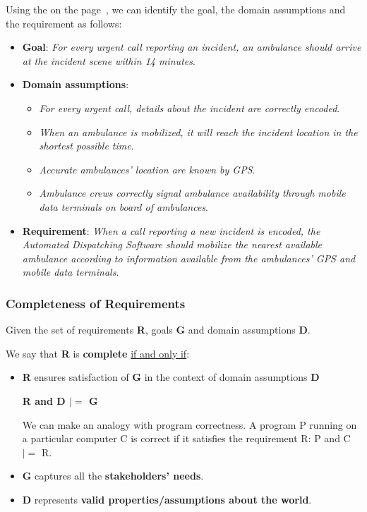 \noindent
Using the  on the page~\pageref{example: ambulance dispatching system}, we can identify the goal, the domain assumptions and the requirement as follows:
\begin{itemize}
    \item \textbf{Goal}: \emph{For every urgent call reporting an incident, an ambulance should arrive at the incident scene within 14 minutes}.

    \item \textbf{Domain assumptions}:
    \begin{itemize}
        \item \emph{For every urgent call, details about the incident are correctly encoded}.
        \item \emph{When an ambulance is mobilized, it will reach the incident location in the shortest possible time}.
        \item \emph{Accurate ambulances' location are known by GPS}.
        \item \emph{Ambulance crews correctly signal ambulance availability through mobile data terminals on board of ambulances}.
    \end{itemize}
    
    \item \textbf{Requirement}: \emph{When a call reporting a new incident is encoded, the Automated Dispatching Software should mobilize the nearest available ambulance according to information available from the ambulances' GPS and mobile data terminals}.
\end{itemize}

\longline

\subsubsection{Completeness of Requirements}

Given the set of requirements \textbf{R}, goals \textbf{G} and domain assumptions \textbf{D}.

\begin{definitionbox}
    We say that \textbf{R} is \textbf{complete} \underline{if and only if}:
    \begin{itemize}
        \item \textbf{R} ensures satisfaction of \textbf{G} in the context of domain assumptions \textbf{D}
        \begin{center}
            \textbf{R and D $|=$ G}
        \end{center}
        We can make an analogy with program correctness. A program P running on a particular computer C is correct if it satisfies the requirement R: P and C $|=$ R.

        \item \textbf{G} captures all the \textbf{stakeholders' needs}.
        
        \item \textbf{D} represents \textbf{valid properties/assumptions about the world}.
    \end{itemize}
\end{definitionbox}